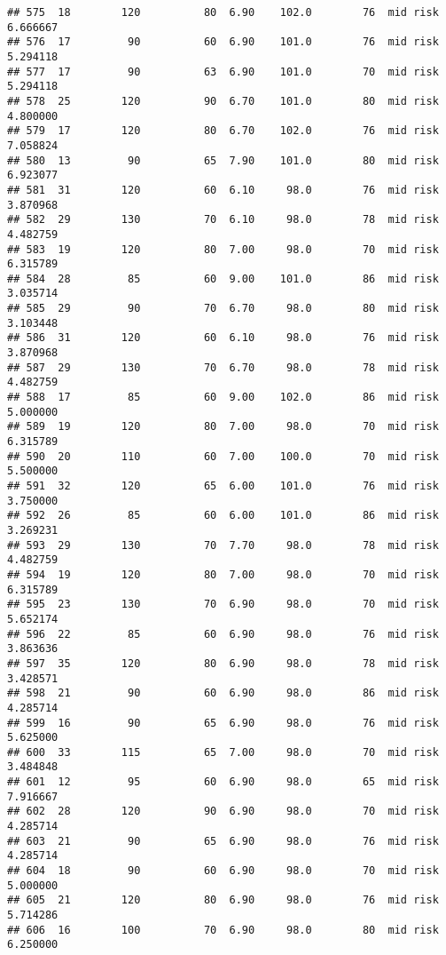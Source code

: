 \documentclass[
  ignorenonframetext,
]{beamer}
\begin{document}
\begin{frame}[fragile]
\begin{verbatim}
## 575  18        120          80  6.90    102.0        76  mid risk      6.666667
## 576  17         90          60  6.90    101.0        76  mid risk      5.294118
## 577  17         90          63  6.90    101.0        70  mid risk      5.294118
## 578  25        120          90  6.70    101.0        80  mid risk      4.800000
## 579  17        120          80  6.70    102.0        76  mid risk      7.058824
## 580  13         90          65  7.90    101.0        80  mid risk      6.923077
## 581  31        120          60  6.10     98.0        76  mid risk      3.870968
## 582  29        130          70  6.10     98.0        78  mid risk      4.482759
## 583  19        120          80  7.00     98.0        70  mid risk      6.315789
## 584  28         85          60  9.00    101.0        86  mid risk      3.035714
## 585  29         90          70  6.70     98.0        80  mid risk      3.103448
## 586  31        120          60  6.10     98.0        76  mid risk      3.870968
## 587  29        130          70  6.70     98.0        78  mid risk      4.482759
## 588  17         85          60  9.00    102.0        86  mid risk      5.000000
## 589  19        120          80  7.00     98.0        70  mid risk      6.315789
## 590  20        110          60  7.00    100.0        70  mid risk      5.500000
## 591  32        120          65  6.00    101.0        76  mid risk      3.750000
## 592  26         85          60  6.00    101.0        86  mid risk      3.269231
## 593  29        130          70  7.70     98.0        78  mid risk      4.482759
## 594  19        120          80  7.00     98.0        70  mid risk      6.315789
## 595  23        130          70  6.90     98.0        70  mid risk      5.652174
## 596  22         85          60  6.90     98.0        76  mid risk      3.863636
## 597  35        120          80  6.90     98.0        78  mid risk      3.428571
## 598  21         90          60  6.90     98.0        86  mid risk      4.285714
## 599  16         90          65  6.90     98.0        76  mid risk      5.625000
## 600  33        115          65  7.00     98.0        70  mid risk      3.484848
## 601  12         95          60  6.90     98.0        65  mid risk      7.916667
## 602  28        120          90  6.90     98.0        70  mid risk      4.285714
## 603  21         90          65  6.90     98.0        76  mid risk      4.285714
## 604  18         90          60  6.90     98.0        70  mid risk      5.000000
## 605  21        120          80  6.90     98.0        76  mid risk      5.714286
## 606  16        100          70  6.90     98.0        80  mid risk      6.250000

\end{verbatim}
\end{frame}
\end{document}
